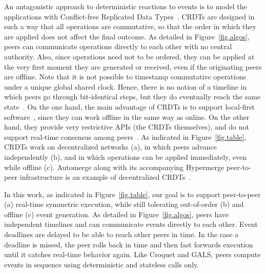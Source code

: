 \documentclass[12pt]{article}
\begin{document}
An antagonistic approach to deterministic reactions to events is to model the
applications with Conflict-free Replicated Data Types~\cite{crdts}.
CRDTs are designed in such a way that all operations are commutative, so that
the order in which they are applied does not affect the final outcome.
%
As detailed in Figure~\ref{fig.algos}, peers can communicate operations
directly to each other with no central authority.
Also, since operations need not to be ordered, they can be applied at the
very first moment they are generated or received, even if the originating peers
are offline.
%
Note that it is not possible to timestamp commutative operations under a unique
global shared clock.
Hence, there is no notion of a timeline in which peers go through bit-identical
steps, but they do eventually reach the same state~\cite{crdts.eventual}.
%
On the one hand, the main advantage of CRDTs is to support local-first
software~\cite{local}, since they can work offline in the same way as online.
On the other hand, they provide very restrictive APIs (the CRDTs themselves),
and do not support real-time consensus among peers~\cite{crdts.consensus}.
%
As indicated in Figure~\ref{fig.table}, CRDTs work on decentralized networks
(a), in which peers advance independently (b), and in which operations can be
applied immediately, even while offline (c).
%
Automerge along with its accompanying Hypermerge peer-to-peer infrastructure
is an example of decentralized CRDTs~\cite{p2p.automerge,p2p.pushpin}.

In this work, as indicated in Figure~\ref{fig.table}, our goal is to support
peer-to-peer (a) real-time symmetric execution, while still tolerating
out-of-order (b) and offline (c) event generation.
%
As detailed in Figure~\ref{fig.algos}, peers have independent timelines and
can communicate events directly to each other.
Event deadlines are delayed to be able to reach other peers in time.
In the case a deadline is missed, the peer rolls back in time and then fast
forwards execution until it catches real-time behavior again.
%
Like Croquet and GALS, peers compute events in sequence using deterministic and
stateless calls only.
\end{document}
